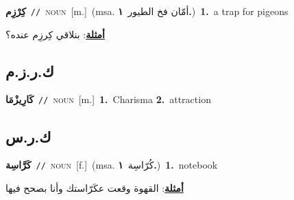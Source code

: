 \documentclass[10pt,a4paper,twoside]{article} %
\begin{document}
\begin{multicols}{2}
{\setlength\topsep{0pt}\textbf{\foreignlanguage{arabic}{كِرْزِم}}\ {\color{gray}\texttt{//}\color{black}}\ \textsc{noun}\ [m.]\ \color{gray}(msa. \foreignlanguage{arabic}{أمّان فخ الطيور}~\foreignlanguage{arabic}{\textbf{١.}})\color{black}\ \textbf{1.}~a trap for pigeons\  \begin{flushright}\color{gray}\foreignlanguage{arabic}{\textbf{\underline{\foreignlanguage{arabic}{أمثلة}}}: بنلاقي كِرزِم عنده؟}\end{flushright}\color{black}} \vspace{2mm}

\vspace{-3mm}
\subsection*{\color{blue}\foreignlanguage{arabic}{ك.ر.ز.م}\color{blue}{ (ntws)}} 

{\setlength\topsep{0pt}\textbf{\foreignlanguage{arabic}{كَارِيزْمَا}}\ {\color{gray}\texttt{//}\color{black}}\ \textsc{noun}\ [m.]\ \textbf{1.}~Charisma  \textbf{2.}~attraction\ } \vspace{2mm}

\vspace{-3mm}
\subsection*{\color{blue}\foreignlanguage{arabic}{ك.ر.س}\color{blue}{}} 

{\setlength\topsep{0pt}\textbf{\foreignlanguage{arabic}{كَرَّاسِة}}\ {\color{gray}\texttt{//}\color{black}}\ \textsc{noun}\ [f.]\ \color{gray}(msa. \foreignlanguage{arabic}{كُرّاسِة}~\foreignlanguage{arabic}{\textbf{١.}})\color{black}\ \textbf{1.}~notebook\  \begin{flushright}\color{gray}\foreignlanguage{arabic}{\textbf{\underline{\foreignlanguage{arabic}{أمثلة}}}: القهوة وقعت عكَرّاستك وأنا بصحح فيها}\end{flushright}\color{black}} \vspace{2mm}


\end{multicols}
\end{document}
